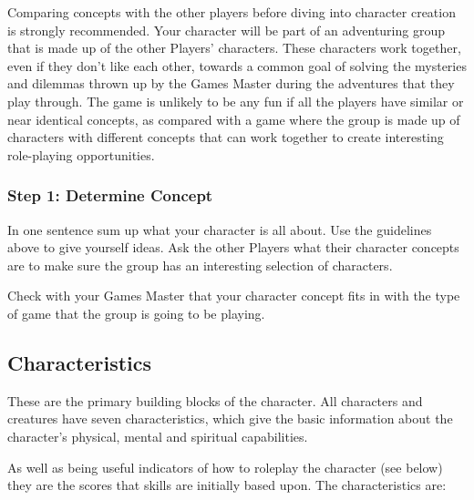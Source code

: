 Comparing concepts with the other players before diving into character creation is strongly recommended. Your character will be part of an adventuring group that is made up of the other Players’ characters. These characters work together, even if they don’t like each other, towards a common goal of solving the mysteries and dilemmas thrown up by the Games Master during the adventures that they play through. The game is unlikely to be any fun if all the players have similar or near identical concepts, as compared with a game where the group is made up of characters with different concepts that can work together to create interesting role-playing opportunities.


\subsubsection{Step 1: Determine Concept}
In one sentence sum up what your character is all about. Use the guidelines above to give yourself ideas. Ask the other Players what their character concepts are to make sure the group has an interesting selection of characters.

Check with your Games Master that your character concept fits in with the type of game that the group is going to be playing.


\subsection{Characteristics}
These are the primary building blocks of the character. All characters and creatures have seven characteristics, which give the basic information about the character’s physical, mental and spiritual capabilities.

As well as being useful indicators of how to roleplay the character (see below) they are the scores that skills are initially based upon. The characteristics are:


